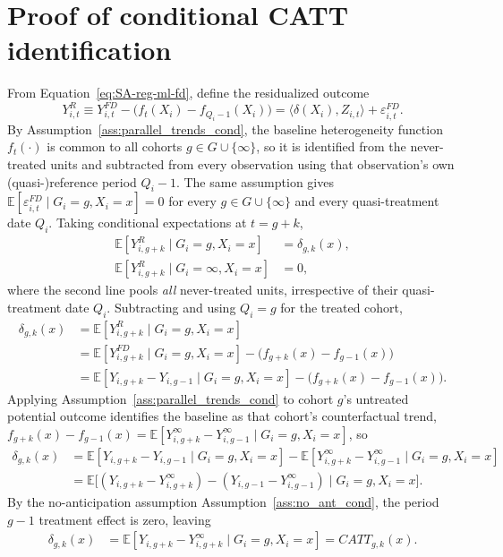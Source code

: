 \documentclass[12pt,notitlepage]{article}
\newcommand{\E}{\mathbb{E}}
\renewcommand{\eqref}[1]{Equation~\ref{#1}}
\newcommand{\assref}[1]{Assumption~\ref{#1}}
\begin{document}
\section{Proof of conditional CATT identification} \label{sec:ccatt_identification}
From \eqref{eq:SA-reg-ml-fd}, define the residualized outcome
\[
Y_{i,t}^{R} \equiv Y_{i,t}^{FD} - \big(f_t(X_i) - f_{Q_i-1}(X_i)\big)
            = \langle \delta(X_i), Z_{i,t}\rangle + \varepsilon_{i,t}^{FD}.
\]
By \assref{ass:parallel_trends_cond}, the baseline heterogeneity function $f_t(\cdot)$ is
common to all cohorts $g \in G \cup \{\infty\}$, so it is identified from the never-treated
units and subtracted from every observation using that observation's own (quasi-)reference
period $Q_i - 1$.
The same assumption gives $\E[\varepsilon_{i,t}^{FD}\mid G_i=g, X_i=x]=0$
for every $g \in G \cup\{\infty\}$ and every quasi-treatment date $Q_i$.
Taking conditional
expectations at $t = g+k$,
\begin{align*}
\E[Y_{i,g+k}^{R}\mid G_i=g, X_i=x]      &= \delta_{g,k}(x),\\
\E[Y_{i,g+k}^{R}\mid G_i=\infty, X_i=x] &= 0,
\end{align*}
where the second line pools \emph{all} never-treated units, irrespective of their
quasi-treatment date $Q_i$.
Subtracting and using $Q_i = g$ for the treated cohort,
\begin{align*}
\delta_{g,k}(x)
  &= \E[Y_{i,g+k}^{R}\mid G_i=g, X_i=x] \\
  &= \E[Y_{i,g+k}^{FD}\mid G_i=g, X_i=x] - \big(f_{g+k}(x) - f_{g-1}(x)\big) \\
  &= \E[Y_{i,g+k} - Y_{i,g-1}\mid G_i=g, X_i=x] - \big(f_{g+k}(x) - f_{g-1}(x)\big).
\end{align*}
Applying \assref{ass:parallel_trends_cond} to cohort $g$'s untreated potential outcome
identifies the baseline as that cohort's counterfactual trend,
$f_{g+k}(x) - f_{g-1}(x) = \E[Y_{i,g+k}^{\infty} - Y_{i,g-1}^{\infty}\mid G_i=g, X_i=x]$,
so
\begin{align*}
\delta_{g,k}(x)
  &= \E[Y_{i,g+k} - Y_{i,g-1}\mid G_i=g, X_i=x]
     - \E[Y_{i,g+k}^{\infty} - Y_{i,g-1}^{\infty}\mid G_i=g, X_i=x] \\
  &= \E\big[(Y_{i,g+k} - Y_{i,g+k}^{\infty}) - (Y_{i,g-1} - Y_{i,g-1}^{\infty})
        \mid G_i=g, X_i=x\big].
\end{align*}
By the no-anticipation assumption \assref{ass:no_ant_cond}, the period $g-1$ treatment effect
is zero, leaving
\begin{align*}
\delta_{g,k}(x)
  &= \E[Y_{i,g+k} - Y_{i,g+k}^{\infty}\mid G_i=g, X_i=x] = CATT_{g,k}(x).
\end{align*}
\end{document}
